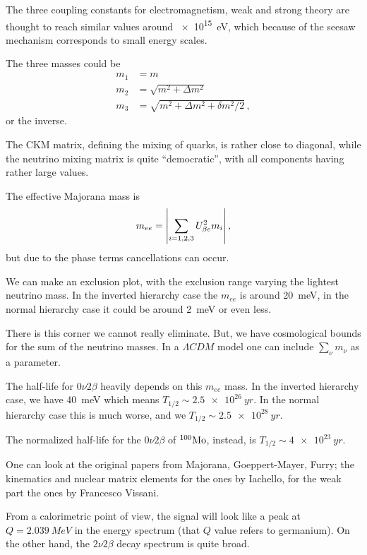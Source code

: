 \documentclass[main.tex]{subfiles}
\begin{document}

The three coupling constants for electromagnetism, weak and strong theory are thought to reach similar values around \SI{e15}{eV}, which because of the seesaw mechanism 
corresponds to small energy scales. 

The three masses could be 
%
\begin{align}
m_1 &= m  \\
m_2 &= \sqrt{m^2 + \Delta m^2}  \\
m_3 &= \sqrt{m^2 + \Delta m^2 + \delta m^2 /2 }
\,,
\end{align}
%
or the inverse. 

The CKM matrix, defining the mixing of quarks, is rather close to diagonal, while the neutrino mixing matrix is quite ``democratic'', with all components having rather large values. 

The effective Majorana mass is 
%
\begin{align}
m_{ee} = \abs{\sum _{i=1, 2, 3} U^2_{\beta e} m_i}
\,,
\end{align}
%
but due to the phase terms cancellations can occur. 

We can make an exclusion plot, with the exclusion range varying the lightest neutrino mass. 
In the inverted hierarchy case the \(m_{ee}\) is around \SI{20}{meV}, in the normal hierarchy case it could be around \SI{2}{meV} or even less. 

There is this corner we cannot really eliminate. 
But, we have cosmological bounds for the sum of the neutrino masses. 
In a \(\Lambda CDM\) model one can include \(\sum _{\nu }m_\nu \) as a parameter. 

The half-life for \(0 \nu  2 \beta \) heavily depends on this  \(m_{ee}\) mass. 
In the inverted hierarchy case, we have \SI{40}{meV} which means \(T_{1/2} \sim \SI{2.5e26}{yr}\). 
In the normal hierarchy case this is much worse, and we \(T_{1/2} \sim \SI{2.5e28}{yr}\).

The normalized half-life for the \(0 \nu 2 \beta \) of \(^{100} \ce{Mo}\), instead, is \(T_{1/2} \sim \SI{4e23}{yr}\).

One can look at the original papers from Majorana, Goeppert-Mayer, Furry; the kinematics and nuclear matrix elements for the ones by Iachello, for the weak part the ones by Francesco Vissani. 

From a calorimetric point of view, the signal will look like a peak at \(Q = \SI{2.039}{MeV}\) in the energy spectrum (that \(Q\) value refers to germanium). 
On the other hand, the \(2 \nu 2 \beta \) decay spectrum is quite broad. 
\end{document}
